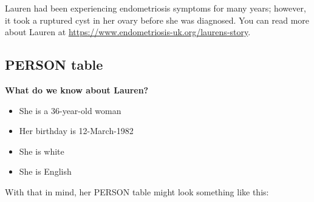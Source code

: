 \documentclass[11pt]{book}
\providecommand{\tightlist}{%
  \setlength{\itemsep}{0pt}\setlength{\parskip}{0pt}}
\theoremstyle{definition}
\theoremstyle{definition}
\theoremstyle{definition}
\theoremstyle{remark}
\begin{document}
Lauren had been experiencing endometriosis symptoms for many years; however, it took a ruptured cyst in her ovary before she was diagnosed. You can read more about Lauren at \url{https://www.endometriosis-uk.org/laurens-story}.

\hypertarget{person}{%
\subsection{PERSON table}\label{person}}

\textbf{What do we know about Lauren?}

\begin{itemize}
\tightlist
\item
  She is a 36-year-old woman
\item
  Her birthday is 12-March-1982
\item
  She is white
\item
  She is English
\end{itemize}

With that in mind, her PERSON table might look something like this:
\end{document}
